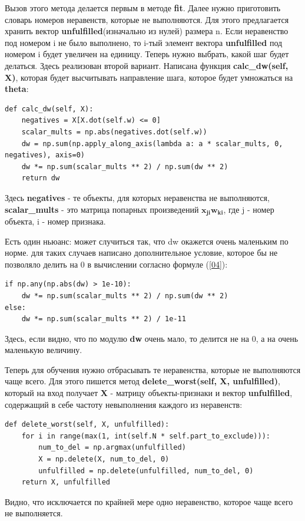 \documentclass[a4paper]{article}
\begin{document}
Вызов этого метода делается первым в методе \textbf{fit}. Далее нужно приготовить словарь номеров неравенств, которые не выполняются. Для этого предлагается хранить вектор \textbf{unfulfilled}(изначально из нулей) размера n. Если неравенство под номером i не было выполнено, то i-тый элемент вектора \textbf{unfulfilled} под номером i будет увеличен на единицу. Теперь нужно выбрать, какой шаг будет делаться. Здесь реализован второй вариант. Написана функция \textbf{calc\_dw(self, X)}, которая будет высчитывать направление шага, которое будет умножаться на \textbf{theta}:
\begin{lstlisting}
def calc_dw(self, X):
	negatives = X[X.dot(self.w) <= 0]
	scalar_mults = np.abs(negatives.dot(self.w))
	dw = np.sum(np.apply_along_axis(lambda a: a * scalar_mults, 0, negatives), axis=0)
 	dw *= np.sum(scalar_mults ** 2) / np.sum(dw ** 2)
 	return dw
\end{lstlisting}

Здесь \textbf{negatives} - те объекты, для которых неравенства не выполняются, \textbf{scalar\_mults} - это матрица попарных произведений $\bm{x_{ji}w_{ki}}$, где j - номер объекта, i - номер признака.

Есть один ньюанс: может случиться так, что dw окажется очень маленьким по норме. для таких случаев написано дополнительное условие, которое бы не позволяло делить на 0 в вычислении согласно формуле (\ref{04}):
\begin{lstlisting}
if np.any(np.abs(dw) > 1e-10):
	dw *= np.sum(scalar_mults ** 2) / np.sum(dw ** 2)
else:
	dw *= np.sum(scalar_mults ** 2) / 1e-11
\end{lstlisting}
Здесь, если видно, что по модулю \textbf{dw} очень мало, то делится не на 0, а на очень маленькую величину.

Теперь для обучения нужно отбрасывать те неравенства, которые не выполняются чаще всего. Для этого пишется метод \textbf{delete\_worst(self, X, unfulfilled)}, который на вход получает \textbf{X}  - матрицу объекты-призна\-ки и вектор \textbf{unfulfilled}, содержащий в себе частоту невыполнения каждого из неравенств:
\begin{lstlisting}
def delete_worst(self, X, unfulfilled):
	for i in range(max(1, int(self.N * self.part_to_exclude))):
		num_to_del = np.argmax(unfulfilled)
		X = np.delete(X, num_to_del, 0)
		unfulfilled = np.delete(unfulfilled, num_to_del, 0)
	return X, unfulfilled
\end{lstlisting}

Видно, что исключается по крайней мере одно неравенство, которое чаще всего не выполняется.
\end{document}
